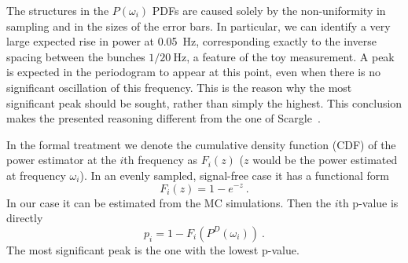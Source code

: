 The structures in the $P(\omega_i)$ PDFs are caused solely by the non-uniformity in sampling and in the sizes of the error bars.
In particular, we can identify a very large expected rise in power at \SI{0.05}{\hertz}, corresponding exactly to the inverse spacing between the bunches $1 / \SI{20}{\hertz}$, a feature of the toy measurement.
A peak is expected in the periodogram to appear at this point, even when there is no significant oscillation of this frequency.
This is the reason why the most significant peak should be sought, rather than simply the highest.
This conclusion makes the presented reasoning different from the one of Scargle~\cite{Scargle1982}.

In the formal treatment we denote the cumulative density function (CDF) of the power estimator at the $i$th frequency as $F_i(z)$ ($z$ would be the power estimated at frequency $\omega_i$).
In an evenly sampled, signal-free case it has a functional form
\begin{equation}
  \label{eq:local_functional_form}
  F_i(z) = 1 - e^{-z} \ .
\end{equation}
In our case it can be estimated from the MC simulations.
Then the $i$th p-value is directly
\begin{equation} \label{eq:local_p_value}
  p_i = 1 - F_i\left( P^D(\omega_i) \right) \ .
\end{equation}
The most significant peak is the one with the lowest p-value.

